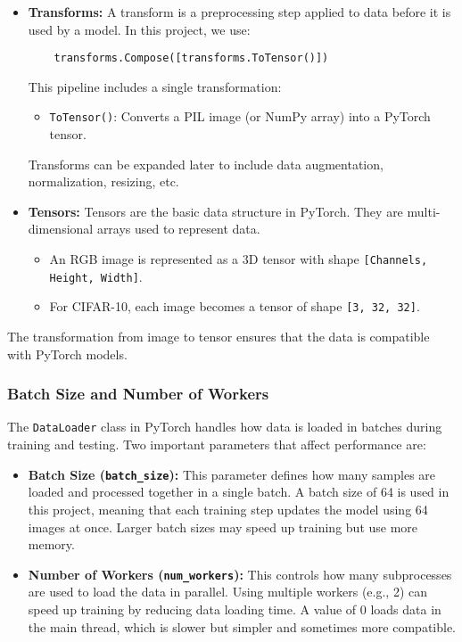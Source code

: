 \begin{itemize}
    \item \textbf{Transforms:}  
    A transform is a preprocessing step applied to data before it is used by a model. In this project, we use:
    \begin{verbatim}
    transforms.Compose([transforms.ToTensor()])
    \end{verbatim}
    This pipeline includes a single transformation:
    \begin{itemize}
        \item \texttt{ToTensor()}: Converts a PIL image (or NumPy array) into a PyTorch tensor.
    \end{itemize}
    Transforms can be expanded later to include data augmentation, normalization, resizing, etc.

    \item \textbf{Tensors:}  
    Tensors are the basic data structure in PyTorch. They are multi-dimensional arrays used to represent data.
    \begin{itemize}
        \item An RGB image is represented as a 3D tensor with shape \texttt{[Channels, Height, Width]}.
        \item For CIFAR-10, each image becomes a tensor of shape \texttt{[3, 32, 32]}.
    \end{itemize}
\end{itemize}

The transformation from image to tensor ensures that the data is compatible with PyTorch models.

\subsubsection{Batch Size and Number of Workers}

The \texttt{DataLoader} class in PyTorch handles how data is loaded in batches during training and testing. Two important parameters that affect performance are:

\begin{itemize}
    \item \textbf{Batch Size (\texttt{batch\_size}):} 
    This parameter defines how many samples are loaded and processed together in a single batch. A batch size of 64 is used in this project, meaning that each training step updates the model using 64 images at once. Larger batch sizes may speed up training but use more memory.

    \item \textbf{Number of Workers (\texttt{num\_workers}):} 
    This controls how many subprocesses are used to load the data in parallel. Using multiple workers (e.g., 2) can speed up training by reducing data loading time. A value of 0 loads data in the main thread, which is slower but simpler and sometimes more compatible.
\end{itemize}

